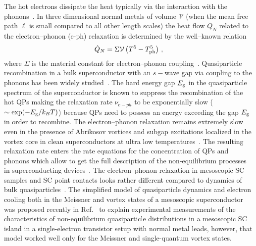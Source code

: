 \documentclass[prx,twocolumn,aps,superscriptaddress,showpacs,amsmath,amssymb,footnoteinbib]{revtex4-1}
\begin{document}
The hot electrons dissipate the heat typically via the interaction
with the phonons~\cite{Eliashberg-JETP72,Kaplan-Scalapino-PRB76,Kopnin-NeqSc}. In
three dimensional normal metals of volume $\mathcal{V}$ (when the mean free path $\ell$ is small compared to all other length scales) the heat
flow $\dot{Q}_N$ related to the electron--phonon (e-ph) relaxation
is determined by the well--known relation
%
\begin{equation}\label{Elec-Phon-Normal}
    \dot{Q}_N = \Sigma \mathcal{V} \left( T^5 - T_{\rm ph}^5 \right)\,,
\end{equation}
%
where $\Sigma$ is the material constant for electron--phonon
coupling~\cite{Giazotto-Pekola-rmp06}. Quasiparticle recombination
in a bulk superconductor with an $s-$wave gap via coupling to the
phonons has been widely studied~\cite{Wellstood-prb94,Timofeev-prl09,Maisi-prl13,Kopnin-NeqSc,Bergeret-Silaev-rmp18}.
The hard energy gap $E_{\rm g}$ in the quasiparticle spectrum of
the superconductor is known to suppress the recombination of the
hot QPs making the relaxation rate $\nu_{e-ph}$ to be
exponentially slow ($\sim \exp(-E_{\rm g} / k_B T)$) because QPs
need to possess an energy exceeding the gap $E_{\rm g}$ in order
to recombine. The electron--phonon relaxation remains extremely
slow even in the presence of Abrikosov vortices and subgap
excitations localized in the vortex core in clean superconductors
at ultra low temperatures~\cite{Kopnin-prb99}. The resulting
relaxation rate enters the rate equations for the concentration of
QPs and phonons which allow to get the full description of the
non-equilibrium processes in superconducting devices~\cite{Rothwarf-prl67}. The electron--phonon relaxation in
mesoscopic SC samples and SC point contacts looks rather different
compared to dynamics of bulk quasiparticles~\cite{Ivanov-Feigelman-JETPL98,Zgirski-Urbina-PRL11,Olivares-Urbina-PRB14,Savich-PRB17}.
The simplified model of quasiparticle dynamics and electron
cooling both in the Meissner and vortex states of a mesoscopic
superconductor was proposed recently in
Ref.~ to explain
experimental measurements of the characteristics of
non-equilibrium quasiparticle distributions in a mesoscopic SC
island in a single-electron transistor setup with normal metal
leads, however, that model worked well only for the Meissner and single-quantum vortex states.
\end{document}
